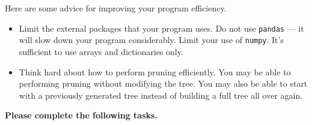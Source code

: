 \documentclass[12pt]{article}
\begin{document}
Here are some advice for improving your program efficiency. 
\begin{itemize}
\item Limit the external packages that your program uses. Do not use \verb+pandas+ --- it will slow down your program considerably. Limit your use of \verb+numpy+. It's sufficient to use arrays and dictionaries only.

\item Think hard about how to perform pruning efficiently. You may be able to performing pruning without modifying the tree. You may also be able to start with a previously generated tree instead of building a full tree all over again.
\end{itemize}

{\bf Please complete the following tasks.}
\end{document}
